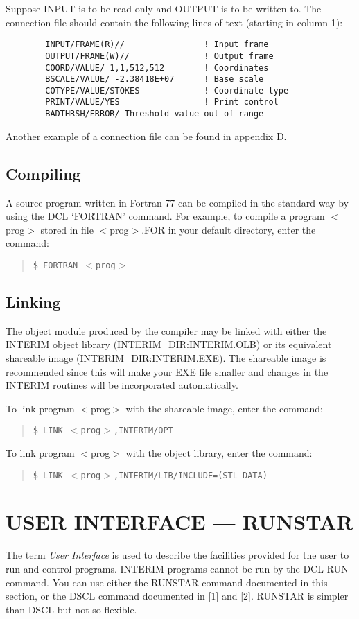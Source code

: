 \documentclass{article}
\begin{document}
Suppose INPUT is to be read-only and OUTPUT is to be written to.
The connection file should contain the following lines of text (starting in
column 1):
\begin{verbatim}
        INPUT/FRAME(R)//                ! Input frame
        OUTPUT/FRAME(W)//               ! Output frame
        COORD/VALUE/ 1,1,512,512        ! Coordinates
        BSCALE/VALUE/ -2.38418E+07      ! Base scale
        COTYPE/VALUE/STOKES             ! Coordinate type
        PRINT/VALUE/YES                 ! Print control
        BADTHRSH/ERROR/ Threshold value out of range
\end{verbatim}
Another example of a connection file can be found in appendix D.
\subsection {Compiling}
A source program written in Fortran 77 can be compiled in the standard way by
using the DCL `FORTRAN' command.
For example, to compile a program $<$prog$>$ stored in file $<$prog$>$.FOR in your
default directory, enter the command:
\begin{quote}
{\tt \$ FORTRAN $<$prog$>$}
\end{quote}
\subsection {Linking}
The object module produced by the compiler may be linked with either the
INTERIM object library (INTERIM\_DIR:INTERIM.OLB) or its equivalent shareable
image (INTERIM\_DIR:INTERIM.EXE).
The shareable image is recommended since this will make your EXE file smaller
and changes in the INTERIM routines will be incorporated automatically.

To link program $<$prog$>$ with the shareable image, enter the command:
\begin{quote}
{\tt \$ LINK $<$prog$>$,INTERIM/OPT}
\end{quote}
To link program $<$prog$>$ with the object library, enter the command:
\begin{quote}
{\tt \$ LINK $<$prog$>$,INTERIM/LIB/INCLUDE=(STL\_DATA)}
\end{quote}
\section {USER INTERFACE --- RUNSTAR}
The term {\em User Interface} is used to describe the facilities provided for
the user to run and control programs.
INTERIM programs cannot be run by the DCL RUN command.
You can use either the RUNSTAR command documented in this section, or the DSCL
command documented in [1] and [2].
RUNSTAR is simpler than DSCL but not so flexible.
\end{document}
